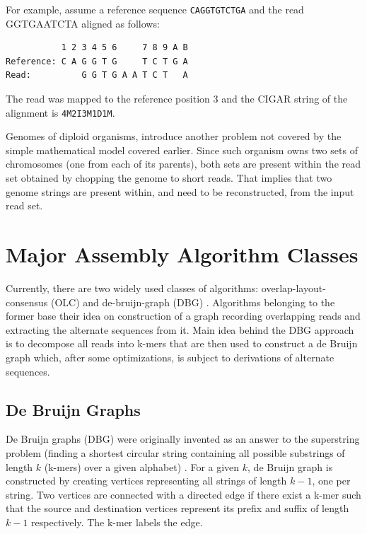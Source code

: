 For example, assume a reference sequence \texttt{CAGGTGTCTGA} and the read GGTGAATCTA aligned as follows:
\begin{verbatim}
           1 2 3 4 5 6     7 8 9 A B
Reference: C A G G T G     T C T G A
Read:          G G T G A A T C T   A
\end{verbatim}
The read was mapped to the reference position 3 and the CIGAR string of the alignment is \texttt{4M2I3M1D1M}.

Genomes of diploid organisms, introduce another problem not covered by the simple mathematical model covered earlier. Since such organism owns two sets of chromosomes (one from each of its parents), both sets are present within the read set obtained by chopping the genome to short reads. That implies that two genome strings are present within, and need to be reconstructed, from the input read set.

\section{Major Assembly Algorithm Classes}
\label{sec:major-assembly-algorithm-classes}

Currently, there are two widely used classes of algorithms: overlap-layout-consensus (OLC) and de-bruijn-graph (DBG) \cite{alg-compare}. Algorithms belonging to the former base their idea on construction of a graph recording overlapping reads and extracting the alternate sequences from it. Main idea behind the DBG approach is to decompose all reads into k-mers that are then used to construct a de Bruijn graph which, after some optimizations, is subject to derivations of alternate sequences.

\subsection{De Bruijn Graphs}
\label{subsec:de-bruijn-graphs}

De Bruijn graphs (DBG) were originally invented as an answer to the superstring problem  (finding a shortest circular string containing all possible substrings of length $k$ (k-mers) over a given alphabet) \cite{dbg-apply}. For a given $k$, de Bruijn graph is constructed by creating vertices representing all strings of length $k-1$, one per string. Two vertices are connected with a directed edge if there exist a k-mer such that the source and destination vertices represent its prefix and suffix of length $k-1$ respectively. The k-mer labels the edge. 

